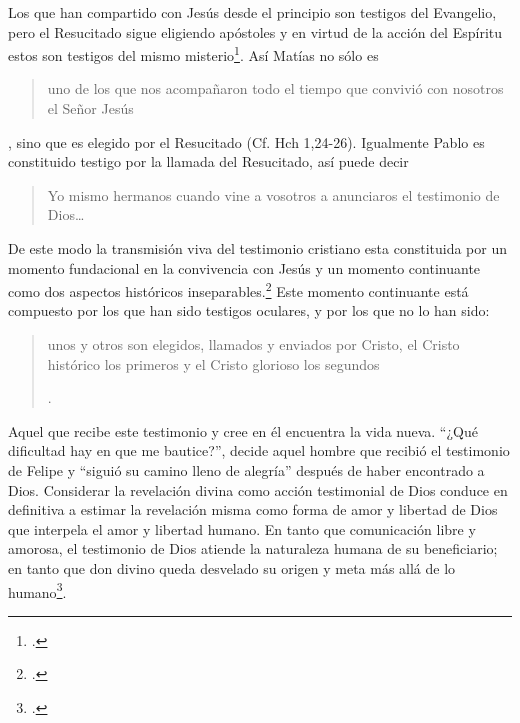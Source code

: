 Los que han compartido con Jesús desde el principio son testigos del Evangelio, pero el Resucitado sigue eligiendo apóstoles y en virtud de la acción del Espíritu estos son testigos del mismo misterio\footcite[Cf.][576]{ninot2009tf}. Así Matías no sólo es \blockquote[][\,(Hch 1,21)]{uno de los que nos acompañaron todo el tiempo que convivió con nosotros el Señor Jesús}, sino que es elegido por el Resucitado (Cf. Hch 1,24-26). Igualmente Pablo es constituido testigo por la llamada del Resucitado, así puede decir \blockquote[][\,(1Cor 2,1)]{Yo mismo hermanos cuando vine a vosotros a anunciaros el testimonio de Dios\ldots}. De este modo la transmisión viva del testimonio cristiano esta constituida por un momento fundacional en la convivencia con Jesús y un momento continuante como dos aspectos históricos inseparables.\footcite[Cf.][148]{prades2015testimonio} Este momento continuante está compuesto por los que han sido testigos oculares, y por los que no lo han sido: \blockquote[{\Cite[148]{prades2015testimonio}}.]{unos y otros son elegidos, llamados y enviados por Cristo, el Cristo histórico los primeros y el Cristo glorioso los segundos}. Aquel que recibe este testimonio y cree en él encuentra la vida nueva. ``¿Qué dificultad hay en que me bautice?'', decide aquel hombre que recibió el testimonio de Felipe y ``siguió su camino lleno de alegría'' después de haber encontrado a Dios. Considerar la revelación divina como acción testimonial de Dios conduce en definitiva a estimar la revelación misma como forma de amor y libertad de Dios que interpela el amor y libertad humano. En tanto que comunicación libre y amorosa, el testimonio de Dios atiende la naturaleza humana de su beneficiario; en tanto que don divino queda desvelado su origen y meta más allá de lo humano\footcite[Cf.][152]{prades2015testimonio}.
